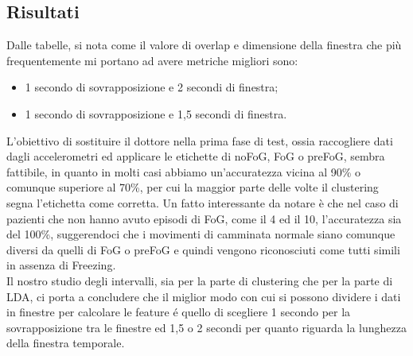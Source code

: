 \subsection{Risultati}
Dalle tabelle, si nota come il valore di overlap e dimensione della finestra che più frequentemente mi portano ad avere metriche migliori sono:
\begin{itemize}
	\item 1 secondo di sovrapposizione e 2 secondi di finestra;
	\item 1 secondo di sovrapposizione e 1,5 secondi di finestra.
\end{itemize}
L'obiettivo di sostituire il dottore nella prima fase di test, ossia raccogliere dati dagli accelerometri ed applicare le etichette di noFoG, FoG o preFoG, sembra fattibile, in quanto in molti casi abbiamo un'accuratezza vicina al 90\% o comunque superiore al 70\%, per cui la maggior parte delle volte il clustering segna l'etichetta come corretta. Un fatto interessante da notare è che nel caso di pazienti che non hanno avuto episodi di FoG, come il 4 ed il 10, l'accuratezza sia del 100\%, suggerendoci che i movimenti di camminata normale siano comunque diversi da quelli di FoG o preFoG e quindi vengono riconosciuti come tutti simili in assenza di Freezing.\\
Il nostro studio degli intervalli, sia per la parte di clustering che per la parte di LDA, ci porta a concludere che il miglior modo con cui si possono dividere i dati in finestre per calcolare le feature é quello di scegliere 1 secondo per la sovrapposizione tra le finestre ed 1,5 o 2 secondi per quanto riguarda la lunghezza della finestra temporale.

